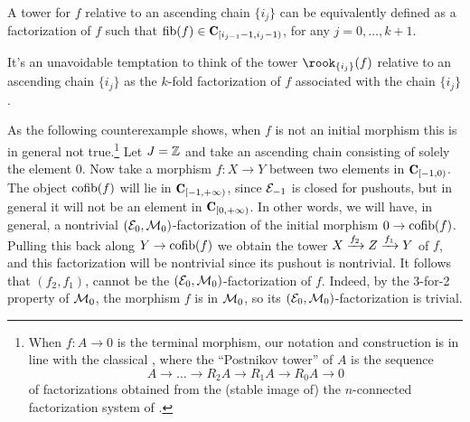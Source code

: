 \documentclass[a4paper,12pt]{amsart}
\begin{document}
\begin{remark}
A tower for $f$ relative to an ascending chain $\{i_j\}$ can be equivalently defined as a factorization of $f$ such that $\mathrm{fib}(f)\in \C_{[i_{j-1}-1,i_j-1)}$, for any $j=0,\dots,k+1$.
\end{remark}
\begin{remark}
It's an unavoidable temptation to think of the tower $\rook_{\{i_j\}}(f)$ relative to an ascending chain $\{i_j\}$ as the $k$-fold factorization of $f$ associated with the chain $\{i_j\}$. 

As the following counterexample shows, when $f$ is not an initial morphism this is in general not true.\footnote{When $f\colon A\to 0$ is the terminal morphism, our notation and construction is in line with the classical \cite{LurieHA}, where the ``Postnikov tower'' of $A$ is the sequence
\[
A\to \dots \to R_2A\to R_1A\to R_0A \to 0
\]
of factorizations obtained from the (stable image of) the $n$-connected factorization system of \cite{Joy}.} Let $J=\mathbb{Z} $ and take an ascending chain consisting of solely the element $0$. Now take a morphism $f\colon X\to Y$ between two elements in $\C_{[-1,0)}$. The object $\operatorname{cofib}(f)$ will lie in $\C_{[-1,+\infty)}$, since $\mathcal{E}_{-1}$ is closed for pushouts, but in general it will not be an element in $\C_{[0,+\infty)}$. In other words, we will have, in general, a nontrivial $(\mathcal{E}_0,\mathcal{M}_0)$-factorization of the initial morphism $0\to \operatorname{cofib}(f)$. Pulling this back along $Y\to \operatorname{cofib}(f)$ we obtain the tower $X\xrightarrow{f_2} Z\xrightarrow{f_1} Y$ of $f$, and this factorization will be nontrivial since its pushout is nontrivial. It follows that $(f_2,f_1)$, cannot be the $(\mathcal{E}_0,\mathcal{M}_0)$-factorization of $f$. Indeed, by the 3-for-2 property of $\mathcal{M}_0$, the morphism $f$ is in $\mathcal{M}_0$, so its $(\mathcal{E}_0,\mathcal{M}_0)$-factorization is trivial. 
\end{remark}
\end{document}
